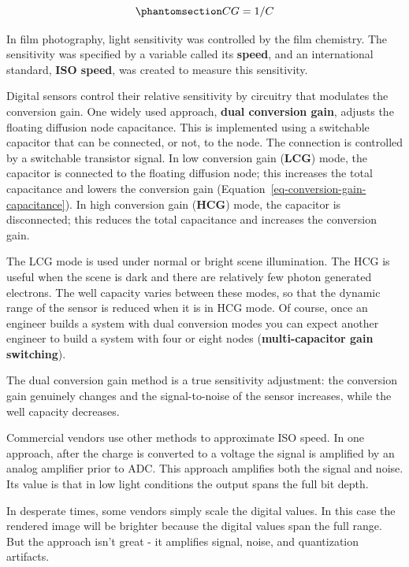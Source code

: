 \documentclass[
  letterpaper,
]{book}
\begin{document}
\begin{equation}\phantomsection\label{eq-conversion-gain-capacitance}{
CG = 1 / C
}\end{equation}

In film photography, light sensitivity was controlled by the film
chemistry. The sensitivity was specified by a variable called its
\textbf{speed}, and an international standard, \textbf{ISO speed}, was
created to measure this sensitivity.

Digital sensors control their relative sensitivity by circuitry that
modulates the conversion gain. One widely used approach, \textbf{dual
conversion gain}, adjusts the floating diffusion node capacitance. This
is implemented using a switchable capacitor that can be connected, or
not, to the node. The connection is controlled by a switchable
transistor signal. In low conversion gain (\textbf{LCG}) mode, the
capacitor is connected to the floating diffusion node; this increases
the total capacitance and lowers the conversion gain
(Equation~\ref{eq-conversion-gain-capacitance}). In high conversion gain
(\textbf{HCG}) mode, the capacitor is disconnected; this reduces the
total capacitance and increases the conversion gain.

The LCG mode is used under normal or bright scene illumination. The HCG
is useful when the scene is dark and there are relatively few photon
generated electrons. The well capacity varies between these modes, so
that the dynamic range of the sensor is reduced when it is in HCG mode.
Of course, once an engineer builds a system with dual conversion modes
you can expect another engineer to build a system with four or eight
nodes (\textbf{multi-capacitor gain switching}).

\begin{tcolorbox}[enhanced jigsaw, opacityback=0, breakable, coltitle=black, leftrule=.75mm, left=2mm, colframe=quarto-callout-note-color-frame, opacitybacktitle=0.6, bottomtitle=1mm, bottomrule=.15mm, toprule=.15mm, title=\textcolor{quarto-callout-note-color}{\faInfo}\hspace{0.5em}{Sensor speed}, titlerule=0mm, toptitle=1mm, colback=white, rightrule=.15mm, colbacktitle=quarto-callout-note-color!10!white, arc=.35mm]

The dual conversion gain method is a true sensitivity adjustment: the
conversion gain genuinely changes and the signal-to-noise of the sensor
increases, while the well capacity decreases.

Commercial vendors use other methods to approximate ISO speed. In one
approach, after the charge is converted to a voltage the signal is
amplified by an analog amplifier prior to ADC. This approach amplifies
both the signal and noise. Its value is that in low light conditions the
output spans the full bit depth.

In desperate times, some vendors simply scale the digital values. In
this case the rendered image will be brighter because the digital values
span the full range. But the approach isn't great - it amplifies signal,
noise, and quantization artifacts.

\end{tcolorbox}
\end{document}
